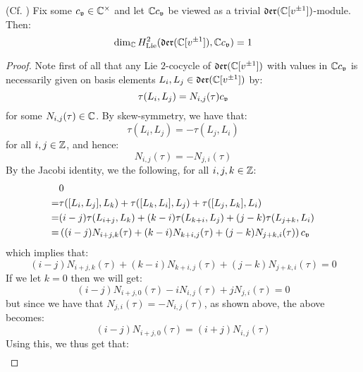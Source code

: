         \begin{lemma} \label{lemma: H^2_of_witt_algebra}
            (Cf. \cite[Proposition 1.3]{kac_raina_rozhkovskaya_bombay_lectures_on_highest_weight_modules_of_infinite_dimensional_lie_algebras}) Fix some $c_{\frakv} \in \bbC^{\x}$ and let $\bbC c_{\frakv}$ be viewed as a trivial $\der(\bbC[v^{\pm 1}])$-module. Then:
                $$\dim_{\bbC} H^2_{\Lie}( \der(\bbC[v^{\pm 1}]), \bbC c_{\frakv} ) = 1$$
        \end{lemma}
            \begin{proof}
                Note first of all that any Lie $2$-cocycle of $\der(\bbC[v^{\pm 1}])$ with values in $\bbC c_{\frakv}$ is necessarily given on basis elements $L_i, L_j \in \der(\bbC[v^{\pm 1}])$ by:
                    $$\tau(L_i, L_j) = N_{i, j}(\tau) c_{\frakv}$$
                for some $N_{i, j}(\tau) \in \bbC$. By skew-symmetry, we have that:
                    $$\tau(L_i, L_j) = -\tau(L_j, L_i)$$
                for all $i, j \in \Z$, and hence:
                    $$N_{i, j}(\tau) = -N_{j, i}(\tau)$$
                By the Jacobi identity, we the following, for all $i, j, k \in \Z$:
                    $$
                        \begin{aligned}
                            & 0
                            \\
                            = & \tau([L_i, L_j], L_k) + \tau([L_k, L_i], L_j) + \tau([L_j, L_k], L_i)
                            \\
                            = & (i - j) \tau(L_{i + j}, L_k) + (k - i) \tau(L_{k + i}, L_j) + (j - k) \tau(L_{j + k}, L_i)
                            \\
                            = & \left( (i - j) N_{i + j, k}(\tau) + (k - i) N_{k + i, j}(\tau) + (j - k) N_{j + k, i}(\tau) \right) c_{\frakv}
                        \end{aligned}
                    $$
                which implies that:
                    $$(i - j) N_{i + j, k}(\tau) + (k - i) N_{k + i, j}(\tau) + (j - k) N_{j + k, i}(\tau) = 0$$
                If we let $k = 0$ then we will get:
                    $$(i - j) N_{i + j, 0}(\tau) - i N_{i, j}(\tau) + j N_{j, i}(\tau) = 0$$
                but since we have that $N_{j, i}(\tau) = -N_{i, j}(\tau)$, as shown above, the above becomes:
                    $$(i - j) N_{i + j, 0}(\tau) = (i + j) N_{i, j}(\tau)$$
                Using this, we thus get that:
                    $$
                        \begin{aligned}

\end{aligned}$$
\end{proof}
